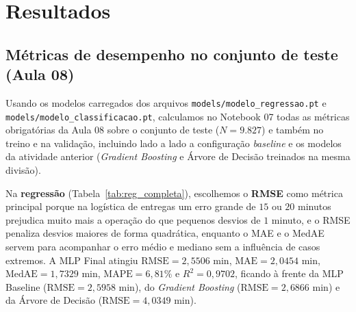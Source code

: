 \documentclass[12pt,a4paper]{article}
\begin{document}
\section{Resultados}

\subsection{Métricas de desempenho no conjunto de teste (Aula 08)}

Usando os modelos carregados dos arquivos \texttt{models/modelo\_regressao.pt} e \texttt{models/modelo\_classificacao.pt}, calculamos no Notebook 07 todas as métricas obrigatórias da Aula 08 sobre o conjunto de teste ($N = 9.827$) e também no treino e na validação, incluindo lado a lado a configuração \textit{baseline} e os modelos da atividade anterior (\textit{Gradient Boosting} e Árvore de Decisão treinados na mesma divisão).

Na \textbf{regressão} (Tabela~\ref{tab:reg_completa}), escolhemos o \textbf{RMSE} como métrica principal porque na logística de entregas um erro grande de $15$ ou $20$ minutos prejudica muito mais a operação do que pequenos desvios de $1$ minuto, e o RMSE penaliza desvios maiores de forma quadrática, enquanto o MAE e o MedAE servem para acompanhar o erro médio e mediano sem a influência de casos extremos. A MLP Final atingiu $\text{RMSE} = 2{,}5506\text{ min}$, $\text{MAE} = 2{,}0454\text{ min}$, $\text{MedAE} = 1{,}7329\text{ min}$, $\text{MAPE} = 6{,}81\%$ e $R^2 = 0{,}9702$, ficando à frente da MLP Baseline ($\text{RMSE} = 2{,}5958\text{ min}$), do \textit{Gradient Boosting} ($\text{RMSE} = 2{,}6866\text{ min}$) e da Árvore de Decisão ($\text{RMSE} = 4{,}0349\text{ min}$).
\end{document}
